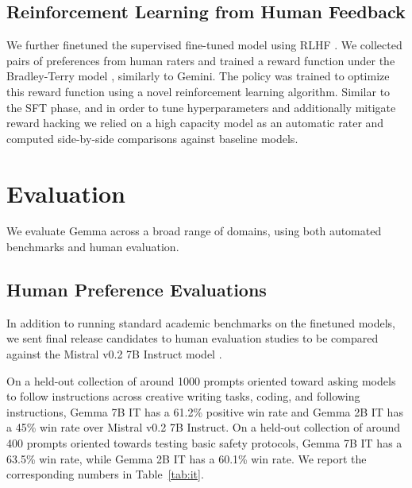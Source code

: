 \documentclass[11pt, a4paper, logo, twocolumn, copyright, nonumbering]{googledeepmind}
\begin{document}
\subsection{Reinforcement Learning from Human Feedback}

We further finetuned the supervised fine-tuned model using RLHF \citep{christiano2017deep,ouyang2022training}. We collected pairs of preferences from human raters and trained a reward function under the Bradley-Terry model \citep{bradley1952rank}, similarly to Gemini. The policy was trained to optimize this reward function using a novel reinforcement learning algorithm. Similar to the SFT phase, and in order to tune hyperparameters and additionally mitigate reward hacking \citep{amodei2016concrete,skalse2022defining} we relied on a high capacity model as an automatic rater and computed side-by-side comparisons against baseline models.

\section{Evaluation}
\label{sec:evals}

We evaluate Gemma across a broad range of domains, using both automated benchmarks and human evaluation.

\subsection{Human Preference Evaluations}
\label{sec:humanevals}


In addition to running standard academic benchmarks on the finetuned models, we sent final release candidates to human evaluation studies to be compared against the Mistral v0.2 7B Instruct model \citep{mistral}.

On a held-out collection of around 1000 prompts oriented toward asking models to follow instructions across creative writing tasks, coding, and following instructions, Gemma 7B IT has a 61.2\% positive win rate and Gemma 2B IT has a 45\% win rate over Mistral v0.2 7B Instruct. On a held-out collection of around 400 prompts oriented towards testing basic safety protocols, Gemma 7B IT has a 63.5\% win rate, while Gemma 2B IT has a 60.1\% win rate. We report the corresponding numbers in Table~\ref{tab:it}.
\end{document}

